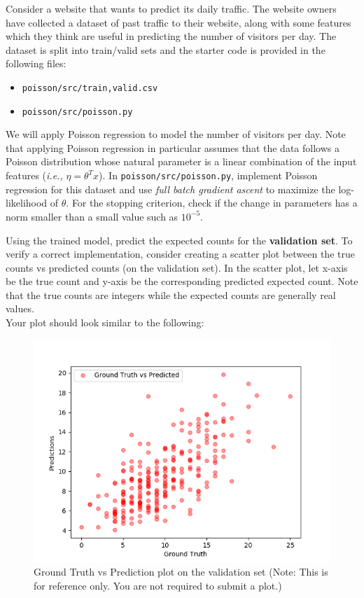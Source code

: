 \item {}

Consider a website that wants to predict its daily traffic. The website owners have collected a dataset of past traffic to their website, along with some features which they think are useful in
predicting the number of visitors per day. The dataset is split into train/valid sets and the starter code is provided in the following files:
\begin{center}
    \begin{itemize}
        \item 	\texttt{poisson/src/{train,valid}.csv}
        \item   \texttt{poisson/src/poisson.py}
    \end{itemize}
\end{center}
We will apply Poisson regression to model the number of visitors per day. Note that applying Poisson regression in particular assumes that the data follows a Poisson distribution whose natural parameter is a linear combination of the input features (\emph{i.e.,} $\eta = \theta^T x$). In \texttt{poisson/src/poisson.py}, implement Poisson regression for this dataset and use \emph{full batch gradient ascent} to maximize the log-likelihood of $\theta$. For the stopping criterion, check if the change in parameters has a norm smaller than a small value such as $10^{-5}$.

Using the trained model, predict the expected counts for the \textbf{validation set}.  To verify a correct implementation, consider creating a scatter plot between the true counts vs predicted counts (on the validation set). In the scatter plot, let x-axis be the true count and y-axis be the corresponding predicted expected count. Note that the true counts are integers while the expected counts are generally real values.\\

Your plot should look similar to the following:

\begin{figure}[H]
	\centering
	\vspace{-2mm}
	\includegraphics[width=0.65\linewidth]{poisson/src/poisson_val.png}
	\caption{Ground Truth vs Prediction plot on the validation set (Note: This is for reference only.  You are not required to submit a plot.)}
\end{figure}